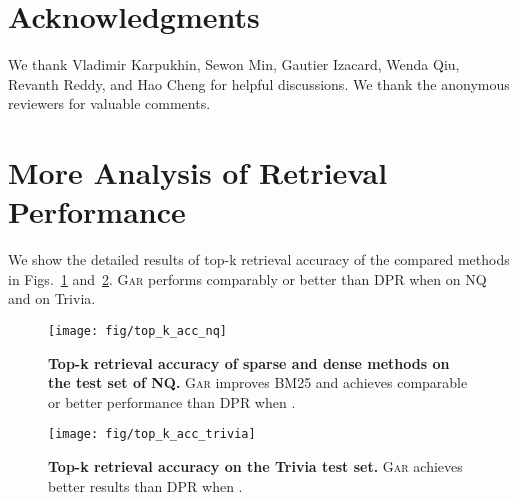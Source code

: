 \documentclass[11pt,a4paper]{article}
\newcommand{\upv}{\vspace{-.0cm}}
\newcommand{\downv}{\vspace{-.1cm}}
\newcommand{\upvf}{\vspace{-.2cm}}
\newcommand{\ours}{\textsc{Gar}\xspace}
\begin{document}
\section*{Acknowledgments}
We thank Vladimir Karpukhin, Sewon Min, Gautier Izacard, Wenda Qiu, Revanth Reddy, and Hao Cheng for helpful discussions. We thank the anonymous reviewers for valuable comments.




\newpage
\clearpage
\appendix

\section{More Analysis of Retrieval Performance}
\label{sec_app:top_k_acc}
We show the detailed results of top-k retrieval accuracy of the compared methods in Figs.~\ref{fig:top_k_acc} and~\ref{fig:top_k_acc_trivia}.
\ours performs comparably or better than DPR when  on NQ and  on Trivia.

\begin{figure}[ht]
    \centering
    \texttt{[image: fig/top\_k\_acc\_nq]}
    \upv
    \upvf
    \vspace{-.4cm}
    \caption{\textbf{Top-k retrieval accuracy of sparse and dense methods on the test set of NQ.} \ours improves BM25 and achieves comparable or  better performance than DPR  when .}
    \label{fig:top_k_acc}
    \downv
\end{figure}

\begin{figure}[ht]
    \centering
    \texttt{[image: fig/top\_k\_acc\_trivia]}
    \upv
    \upvf
    \vspace{-.4cm}
    \caption{\textbf{Top-k retrieval accuracy on the Trivia test set.} \ours achieves better results than DPR when .}
    \label{fig:top_k_acc_trivia}
    \downv
\end{figure}
\end{document}
